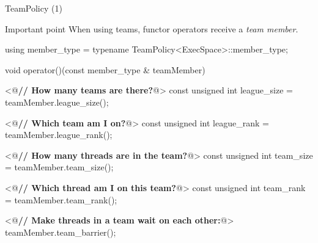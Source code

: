 \begin{frame}[fragile]{TeamPolicy (1)}

  \begin{block}{Important point}
    When using teams, functor operators receive a \emph{team member}.
  \end{block}

  \begin{code}[linebackgroundcolor={
      },
      keywords={}
    ]
using member_type = typename TeamPolicy<ExecSpace>::member_type;

void operator()(const member_type & teamMember) {
  <@{\bf // How many teams are there?}@>
  const unsigned int league_size = teamMember.league_size();

  <@{\bf // Which team am I on?}@>
  const unsigned int league_rank = teamMember.league_rank();

  <@{\bf // How many threads are in the team?}@>
  const unsigned int team_size = teamMember.team_size();

  <@{\bf // Which thread am I on this team?}@>
  const unsigned int team_rank = teamMember.team_rank();

  <@{\bf // Make threads in a team wait on each other:}@>
  teamMember.team_barrier();
}
  \end{code}

\end{frame}



